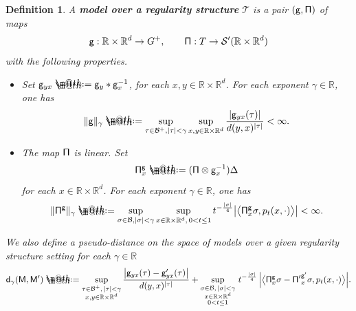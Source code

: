 \documentclass[10pt, reqno]{amsart}
\makeatletter
\numberwithin{subsection}{section}
\numberwithin{subsubsection}{subsection}
\numberwithin{equation}{section} %
\theoremstyle{mystyle}
\newtheorem{defn}[thm]{ \hspace{-0.31cm} {Definition}}%
\theoremstyle{mystyle2}
\theoremstyle{mystyle3}
\newcommand\bbR{\mathbb{R}}
\newcommand{\mcB}{\mathcal{B}}
\newcommand\mcS{\mathcal{S}}
\newcommand*{\defeq}{\mathrel{\rlap{%
                     \raisebox{0.3ex}{$\m@th\cdot$}}%
                     \raisebox{-0.3ex}{$\m@th\cdot$}}%
                     =}
\makeatother
\begin{document}
\begin{defn} \label{DefnModel}
A \textbf{\textsf{model over a regularity structure}} $\mathscr{T}$ is a pair $({\sf g}, {\sf \Pi})$ of maps
$$
{\sf g} : \bbR\times\bbR^d \rightarrow G^+, \qquad {\sf \Pi} : T\rightarrow \mcS'(\bbR\times\bbR^d)
$$
with the following properties.   \vspace{0.1cm}
\begin{itemize}
\setlength{\itemsep}{0.1cm}
   \item Set ${\sf g}_{yx}\defeq {\sf g}_y*{\sf g}_x^{-1}$, for each $x,y\in\bbR\times\bbR^d$. For each exponent $\gamma\in\bbR$, one has
\begin{align}\label{EqEstimateGammayx}
\|{\sf g}\|_\gamma\defeq  \sup_{\tau\in\mcB^+,|\tau|<\gamma}\sup_{x,y\in\bbR\times\bbR^d}\frac{|{\sf g}_{yx}(\tau)|}{d(y,x)^{|\tau|}} < \infty.
\end{align}

   \item The map ${\sf\Pi}$ is linear. Set 
   $$
   {\sf\Pi}_x^{\sf g}\defeq ({\sf\Pi}\otimes{\sf g}_x^{-1})\Delta
   $$ 
   for each $x\in\bbR\times\bbR^d$. For each exponent $\gamma\in\bbR$, one has 
\begin{align}\label{EqestimatePix}
\|{\sf\Pi}^{\sf g}\|_\gamma \defeq  \sup_{\sigma\in\mcB, |\sigma|<\gamma}\sup_{x\in\bbR\times\bbR^d,\, 0<t\le 1} t^{-\frac{|\sigma|}{4}} \big|\big\langle {\sf\Pi}_x^{\sf g}\sigma , p_t(x,\cdot) \big\rangle\big| <  \infty.
\end{align}
\end{itemize}
We also define a pseudo-distance on the space of models over a given regularity structure setting for each $\gamma\in\bbR$
\begin{equation} \label{EqPseudoDistanceModels}
{\sf d}_\gamma{\sf (M,M')} \defeq  
\sup_{\substack{\tau\in\mcB^+,\, |\tau|<\gamma \\ x,y\in\bbR\times\bbR^d}}\frac{\big|{\sf g}_{yx}(\tau)-{\sf g}'_{yx}(\tau)\big|}{d(y,x)^{|\tau|}} 
+ \sup_{\substack{\sigma\in\mcB,\,|\sigma|<\gamma \\ x\in\bbR\times\bbR^d \\ 0<t\leq 1}}\,t^{-\frac{|\sigma|}{4}}\,\Big|\big\langle {\sf\Pi}_x^{\sf g}\sigma - {\sf\Pi'}_x^{\sf g'}\sigma , p_t(x,\cdot) \big\rangle\Big|. 
\end{equation}
\end{defn}

\medskip
\end{document}
